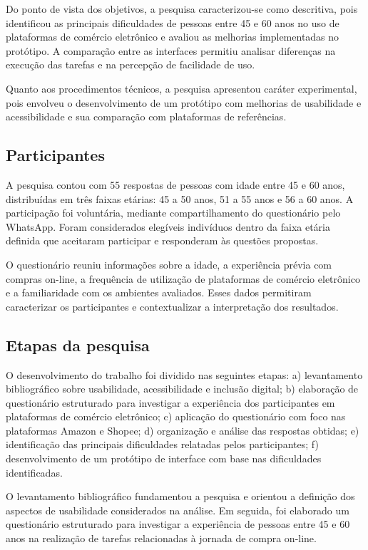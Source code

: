 \documentclass[12pt,a4paper]{article}
\begin{document}
Do ponto de vista dos objetivos, a pesquisa caracterizou-se como descritiva, pois identificou as principais dificuldades de pessoas entre 45 e 60 anos no uso de plataformas de comércio eletrônico e avaliou as melhorias implementadas no protótipo. A comparação entre as interfaces permitiu analisar diferenças na execução das tarefas e na percepção de facilidade de uso.

Quanto aos procedimentos técnicos, a pesquisa apresentou caráter experimental, pois envolveu o desenvolvimento de um protótipo com melhorias de usabilidade e acessibilidade e sua comparação com plataformas de referências.

\subsection{Participantes}

A pesquisa contou com 55 respostas de pessoas com idade entre 45 e 60 anos, distribuídas em três faixas etárias: 45 a 50 anos, 51 a 55 anos e 56 a 60 anos. A participação foi voluntária, mediante compartilhamento do questionário pelo WhatsApp. Foram considerados elegíveis indivíduos dentro da faixa etária definida que aceitaram participar e responderam às questões propostas.

O questionário reuniu informações sobre a idade, a experiência prévia com compras on-line, a frequência de utilização de plataformas de comércio eletrônico e a familiaridade com os ambientes avaliados. Esses dados permitiram caracterizar os participantes e contextualizar a interpretação dos resultados.

\subsection{Etapas da pesquisa}

O desenvolvimento do trabalho foi dividido nas seguintes etapas: a) levantamento bibliográfico sobre usabilidade, acessibilidade e inclusão digital; b) elaboração de questionário estruturado para investigar a experiência dos participantes em plataformas de comércio eletrônico; c) aplicação do questionário com foco nas plataformas Amazon e Shopee; d) organização e análise das respostas obtidas; e) identificação das principais dificuldades relatadas pelos participantes; f) desenvolvimento de um protótipo de interface com base nas dificuldades identificadas.

O levantamento bibliográfico fundamentou a pesquisa e orientou a definição dos aspectos de usabilidade considerados na análise. Em seguida, foi elaborado um questionário estruturado para investigar a experiência de pessoas entre 45 e 60 anos na realização de tarefas relacionadas à jornada de compra on-line.
\end{document}

